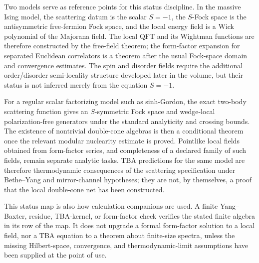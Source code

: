 Two models serve as reference points for this status discipline.  In the
massive Ising model, the scattering datum is the scalar \(S=-1\), the
\(S\)-Fock space is the antisymmetric free-fermion Fock space, and the local
energy field is a Wick polynomial of the Majorana field.  The local QFT and
its Wightman functions are therefore constructed by the free-field theorem;
the form-factor expansion for separated Euclidean correlators is a theorem
after the usual Fock-space domain and convergence estimates.  The spin and
disorder fields require the additional order/disorder semi-locality structure
developed later in the volume, but their status is not inferred merely from
the equation \(S=-1\).

For a regular scalar factorizing model such as sinh-Gordon, the exact
two-body scattering function gives an \(S\)-symmetric Fock space and
wedge-local polarization-free generators under the standard analyticity and
crossing bounds.  The existence of nontrivial double-cone algebras is then a
conditional theorem once the relevant modular nuclearity estimate is proved.
Pointlike local fields obtained from form-factor series, and completeness of a
declared family of such fields, remain separate analytic tasks.  TBA
predictions for the same model are therefore thermodynamic consequences of
the scattering specification under Bethe--Yang and mirror-channel hypotheses;
they are not, by themselves, a proof that the local double-cone net has been
constructed.

This status map is also how calculation companions are used.  A finite
Yang--Baxter, residue, TBA-kernel, or form-factor check verifies the stated
finite algebra in its row of the map.  It does not upgrade a formal
form-factor solution to a local field, nor a TBA equation to a theorem about
finite-size spectra, unless the missing Hilbert-space, convergence, and
thermodynamic-limit assumptions have been supplied at the point of use.

